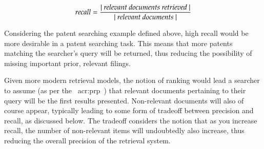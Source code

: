 \begin{equation*}
recall = \frac{|~\text{\emph{relevant documents retrieved}}~|}{|~\text{\emph{relevant documents}}~|}
\end{equation*}

Considering the patent searching example defined above, high recall would be more desirable in a patent searching task. This means that more patents matching the searcher's query will be returned, thus reducing the possibility of missing important prior, relevant filings.

Given more modern retrieval models, the notion of ranking would lead a searcher to assume (as per the ~\gls{acr:prp}~\citep{robertson1977prp}) that relevant documents pertaining to their query will be the first results presented. Non-relevant documents will also of course appear, typically leading to some form of tradeoff between precision and recall, as discussed below. The tradeoff considers the notion that as you increase recall, the number of non-relevant items will undoubtedly also increase, thus reducing the overall precision of the retrieval system.

